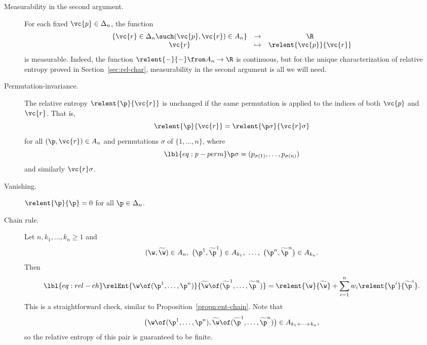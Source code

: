 \begin{description}
\item[Measurability%
% 
% 
% 
in the second argument.]
For each fixed $\vc{p} \in \Delta_n$, the function
\[
\begin{array}{ccc}
\{ \vc{r} \in \Delta_n \such (\vc{p}, \vc{r}) \in A_n \}        &
\to     &
\R     \\
\vc{r}  &
\mapsto &
\relent{\vc{p}}{\vc{r}}
\end{array}
\]
is measurable.  Indeed, the function $\relent{-}{-} \from A_n \to \R$ is
continuous, but for the unique characterization of relative entropy proved
in Section~\ref{sec:rel-char}, measurability in the second argument is all
we will need.

\item[Permutation-invariance.]%
% 
%
% 
The relative entropy $\relent{\p}{\vc{r}}$ is unchanged if the same
permutation is applied to the indices of both $\vc{p}$ and $\vc{r}$.  That
is,
\[
\relent{\p}{\vc{r}}
=
\relent{\p\sigma}{\vc{r}\sigma}
\]
for all $(\p, \vc{r}) \in A_n$ and permutations $\sigma$ of $\{1, \ldots,
n\}$, where
% 
\begin{equation}
\lbl{eq:p-perm}
\p\sigma = (p_{\sigma(1)}, \ldots, p_{\sigma(n)})
\end{equation}
% 
and similarly $\vc{r}\sigma$.  

\item[Vanishing.]%
% 
%
% 
$\relent{\p}{\p} = 0$ for all $\p \in \Delta_n$.

\item[Chain rule.]
%
Let $n, k_1, \ldots, k_n \geq 1$ and
\[
(\w, \widetilde{\w}) \in A_n, \  
\bigl(\p^1, \widetilde{\p}^1\bigr) \in A_{k_1}, \ 
\ldots, \ 
\bigl(\p^n, \widetilde{\p}^n\bigr) \in A_{k_n}.
\]
Then
% 
\begin{equation}
\lbl{eq:rel-ch}
\relEnt{\w \of (\p^1, \ldots, \p^n)}
{\widetilde{\w} \of (\widetilde{\p}^1, \ldots, \widetilde{\p}^n)}
=
\relent{\w}{\widetilde{\w}} + \sum_{i = 1}^n w_i
\relent{\p^i}{\widetilde{\p}^i}. 
\end{equation}
% 
This is a straightforward check, similar to
Proposition~\ref{propn:ent-chain}.  Note that
\[
\bigl(\w \of (\p^1, \ldots, \p^n),
\widetilde{\w} \of (\widetilde{\p}^1, \ldots, \widetilde{\p}^n)\bigr)
\in 
A_{k_1 + \cdots + k_n},
\]
so the relative entropy of this pair is guaranteed to be finite.


\end{description}
